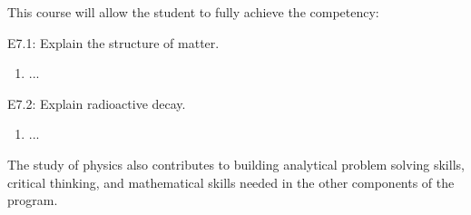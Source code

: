 {This course will allow the student to fully achieve the competency:

E7.1: Explain the structure of matter.
\begin{enumerate}
\item ...
\end{enumerate}

E7.2: Explain radioactive decay.
\begin{enumerate}
\item ...
\end{enumerate}

The study of physics also contributes to building analytical problem solving skills, critical thinking, and mathematical skills needed in the other components of the program.
}